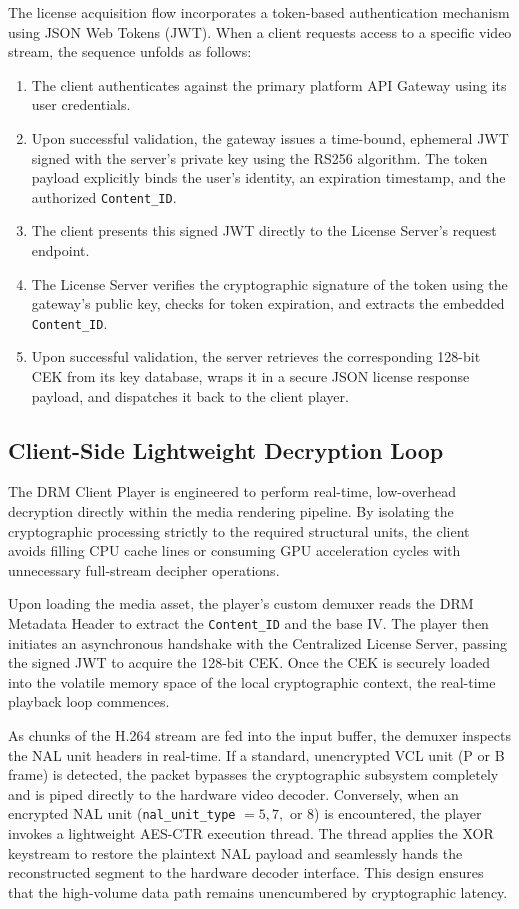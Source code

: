 The license acquisition flow incorporates a token-based authentication mechanism using JSON Web Tokens (JWT). When a client requests access to a specific video stream, the sequence unfolds as follows:
\begin{enumerate}
    \item The client authenticates against the primary platform API Gateway using its user credentials.
    \item Upon successful validation, the gateway issues a time-bound, ephemeral JWT signed with the server's private key using the RS256 algorithm. The token payload explicitly binds the user's identity, an expiration timestamp, and the authorized \texttt{Content\_ID}.
    \item The client presents this signed JWT directly to the License Server's request endpoint.
    \item The License Server verifies the cryptographic signature of the token using the gateway's public key, checks for token expiration, and extracts the embedded \texttt{Content\_ID}.
    \item Upon successful validation, the server retrieves the corresponding 128-bit CEK from its key database, wraps it in a secure JSON license response payload, and dispatches it back to the client player.
\end{enumerate}

\subsection{Client-Side Lightweight Decryption Loop}
The DRM Client Player is engineered to perform real-time, low-overhead decryption directly within the media rendering pipeline. By isolating the cryptographic processing strictly to the required structural units, the client avoids filling CPU cache lines or consuming GPU acceleration cycles with unnecessary full-stream decipher operations.

Upon loading the media asset, the player's custom demuxer reads the DRM Metadata Header to extract the \texttt{Content\_ID} and the base $\text{IV}$. The player then initiates an asynchronous handshake with the Centralized License Server, passing the signed JWT to acquire the 128-bit CEK. Once the CEK is securely loaded into the volatile memory space of the local cryptographic context, the real-time playback loop commences.

As chunks of the H.264 stream are fed into the input buffer, the demuxer inspects the NAL unit headers in real-time. If a standard, unencrypted VCL unit (P or B frame) is detected, the packet bypasses the cryptographic subsystem completely and is piped directly to the hardware video decoder. Conversely, when an encrypted NAL unit (\texttt{nal\_unit\_type} $= 5, 7, \text{ or } 8$) is encountered, the player invokes a lightweight AES-CTR execution thread. The thread applies the XOR keystream to restore the plaintext NAL payload and seamlessly hands the reconstructed segment to the hardware decoder interface. This design ensures that the high-volume data path remains unencumbered by cryptographic latency.